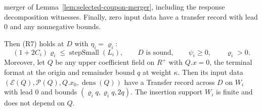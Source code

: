 \begin{proposition}
\begin{enumerate}
  merger of Lemma~\ref{lem:selected-coupon-merger}, including the response decomposition
  witnesses. Finally, zero input data have a
  transfer record with lead $0$ and any nonnegative bounds.
\end{enumerate}
Then (R7) holds at $D$ with $\eta_i=\varrho_i$:
\[
 (1+2C_i)\varrho_i\le\operatorname{stepSmall}(L_i),\qquad
 D\text{ is sound},\qquad \psi_i\ge0,\qquad \varrho_i>0.
\]
Moreover, let $Q$ be any upper coefficient field on $R^+$ with
$Q.x=0$, the terminal format at the origin and remainder bound $q$ at
weight $\kappa$. Then its input data
$(\mathcal E(Q),\mathcal P(Q),Q.x_0,\operatorname{dens}(Q))$ have a
Transfer record across $D$ on $W_i$ with lead $0$ and bounds
$(\varrho_iq,\varrho_iq,2q)$. The insertion support $W_i$ is finite and does not
depend on $Q$.
\end{proposition}

